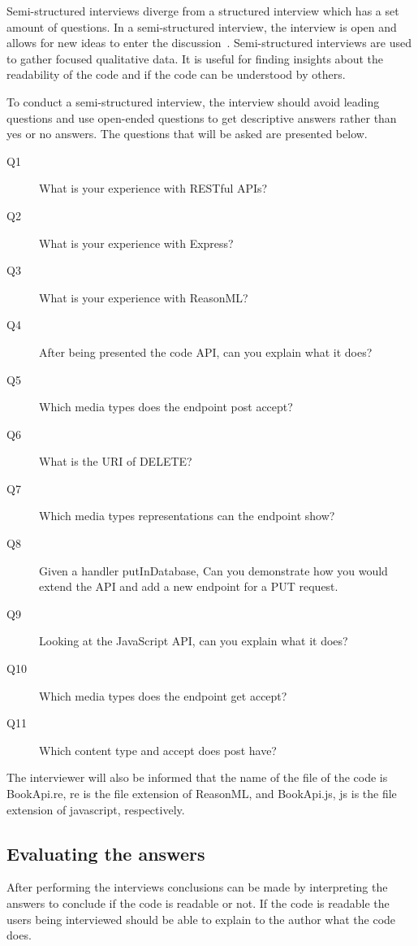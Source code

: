 Semi-structured interviews diverge from a structured interview which has a set
amount of questions. In a semi-structured interview, the interview is open and
allows for new ideas to enter the discussion~\cite{longhurst2003semi}.
Semi-structured interviews are used to gather focused qualitative data. It is
useful for finding insights about the readability of the code and if the code
can be understood by others.

To conduct a semi-structured interview, the interview should avoid leading
questions and use open-ended questions to get descriptive answers rather than
yes or no answers. The questions that will be asked are presented below.

\begin{description}
    \item[Q1] What is your experience with RESTful APIs?
    \item[Q2] What is your experience with Express?
    \item[Q3] What is your experience with ReasonML?
    \item[Q4] After being presented the code API, can you explain what it does?
    \item[Q5] Which media types does the endpoint post accept?
    \item[Q6] What is the URI of DELETE?
    \item[Q7] Which media types representations can the endpoint show?
    \item[Q8] Given a handler putInDatabase, Can you demonstrate how you would
        extend the API and add a new endpoint for a PUT request.
    \item[Q9] Looking at the JavaScript API, can you explain what it does?
    \item[Q10] Which media types does the endpoint get accept?
    \item[Q11] Which content type and accept does post have?
\end{description}

The interviewer will also be informed that the name of the file of the code is
BookApi.re, re is the file extension of ReasonML, and BookApi.js, js is the file
extension of javascript, respectively. 

\subsection{Evaluating the answers}

After performing the interviews conclusions can be made by interpreting the
answers to conclude if the code is readable or not. If the code is readable the
users being interviewed should be able to explain to the author what the code
does.

